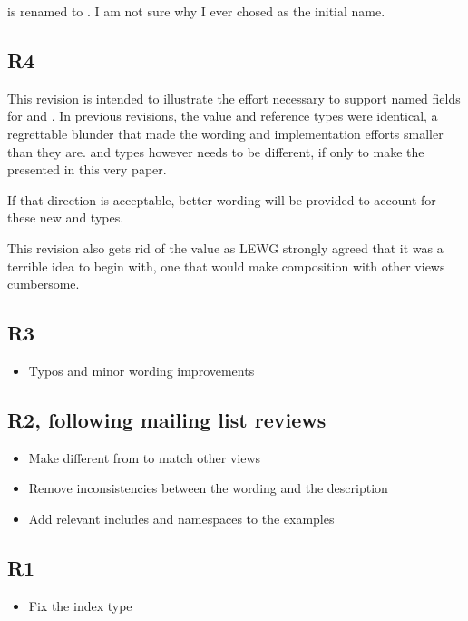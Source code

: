 \documentclass{wg21}
\begin{document}
 is renamed to . I am not sure why I ever chosed  as the initial name.

\subsection{R4}

This revision is intended to illustrate the effort necessary to support named fields for  and .
In previous revisions, the value and reference types were identical, a regrettable blunder that made the wording and implementation efforts smaller than they are.
 and  types however needs to be different, if only to make the  presented in this very paper.

If that direction is acceptable, better wording will be provided to account for these new  and  types.

This revision also gets rid of the   value as LEWG strongly agreed that it was a terrible idea to begin with, one that would make composition with other views cumbersome.

\subsection{R3}

\begin{itemize}
    \item Typos and minor wording improvements
\end{itemize}

\subsection{R2, following mailing list reviews}
\begin{itemize}
    \item Make  different from   to match other views
    \item Remove inconsistencies between the wording and the description
    \item Add relevant includes and namespaces to the examples
\end{itemize}


\subsection{R1}
\begin{itemize}
\item Fix the index type
\end{itemize}
\end{document}
